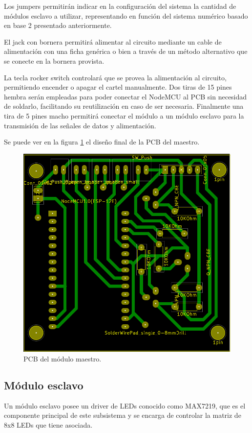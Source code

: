 Los jumpers permitirán indicar en la configuración del sistema la cantidad de módulos esclavo a utilizar, representando en función del sistema numérico basado en base 2 presentado anteriormente.

El jack con bornera permitirá alimentar al circuito mediante un cable de alimentación con una ficha genérica o bien a través de un método alternativo que se conecte en la bornera provista.

La tecla rocker switch controlará que se provea la alimentación al circuito, permitiendo encender o apagar el cartel manualmente. Dos tiras de 15 pines hembra serán empleadas para poder conectar el NodeMCU al PCB sin necesidad de soldarlo, facilitando su reutilización en caso de ser necesaria. Finalmente una tira de 5 pines macho permitirá conectar el módulo a un módulo esclavo para la transmisión de las señales de datos y alimentación.

Se puede ver en la figura \ref{fig:pcb-master} el diseño final de la PCB del maestro.
\begin{figure}[ht!]
	\centering
	\includegraphics[width=\linewidth]{imagenes/pcb-master.pdf}
	\caption{PCB del módulo maestro.}
	\label{fig:pcb-master}
\end{figure}

\clearpage
\subsection{Módulo esclavo}
Un módulo esclavo posee un driver de LEDs conocido como MAX7219, que es el componente principal de este subsistema y se encarga de controlar la matriz de 8x8 LEDs que tiene asociada.

